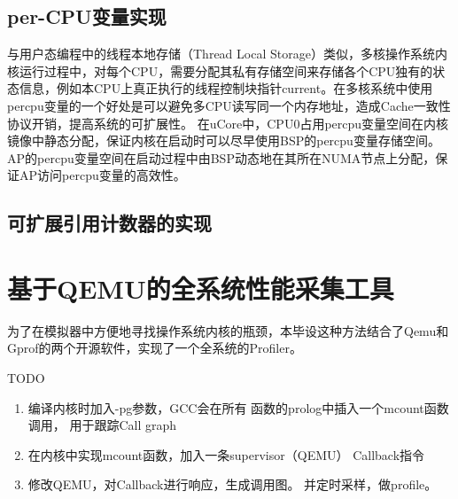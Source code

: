 \subsection{per-CPU变量实现}
\label{subsec:percpu}

与用户态编程中的线程本地存储（Thread Local Storage）类似，多核操作系统内核运行过程中，对每个CPU，需要分配其私有存储空间来存储各个CPU独有的状态信息，例如本CPU上真正执行的线程控制块指针current。在多核系统中使用percpu变量的一个好处是可以避免多CPU读写同一个内存地址，造成Cache一致性协议开销，提高系统的可扩展性。
在uCore中，CPU0占用percpu变量空间在内核镜像中静态分配，保证内核在启动时可以尽早使用BSP的percpu变量存储空间。AP的percpu变量空间在启动过程中由BSP动态地在其所在NUMA节点上分配，保证AP访问percpu变量的高效性。

\subsection{可扩展引用计数器的实现}
\label{subsec:refcache}

\section{基于QEMU的全系统性能采集工具}
为了在模拟器中方便地寻找操作系统内核的瓶颈，本毕设这种方法结合了Qemu和Gprof的两个开源软件，实现了一个全系统的Profiler。

TODO

	\begin{enumerate}
		\item 编译内核时加入-pg参数，GCC会在所有
			函数的prolog中插入一个mcount函数调用，
			用于跟踪Call graph
		\item 在内核中实现mcount函数，加入一条supervisor（QEMU）
			Callback指令
		\item 修改QEMU，对Callback进行响应，生成调用图。
			并定时采样，做profile。
	\end{enumerate}

